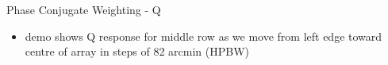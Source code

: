 \documentclass[pdf,azure,slideColor,colorBG]{prosper}
\begin{document}
\begin{slide}{Phase Conjugate Weighting - Q}
\begin{small}
\begin{itemize}
\item demo shows Q response for middle row as we move from left edge toward centre of array in steps of 82 arcmin (HPBW)
\end{itemize}
\end {small}
{\centering
{}
}
\end{slide}
\end{document}
